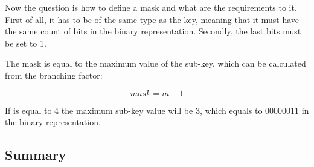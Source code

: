Now the question is how to define a mask and what are the requirements to it. First of all, it has to be of the same type as the key, meaning that it must have the same count of bits in the binary representation. Secondly, the last \x bits must be set to 1.

The mask is equal to the maximum value of the sub-key, which can be calculated from the branching factor:

\begin{equation}
    mask = m - 1
\end{equation}

If \m is equal to 4 the maximum sub-key value will be 3, which equals to 00000011 in the binary representation.

\subsection*{Summary}

